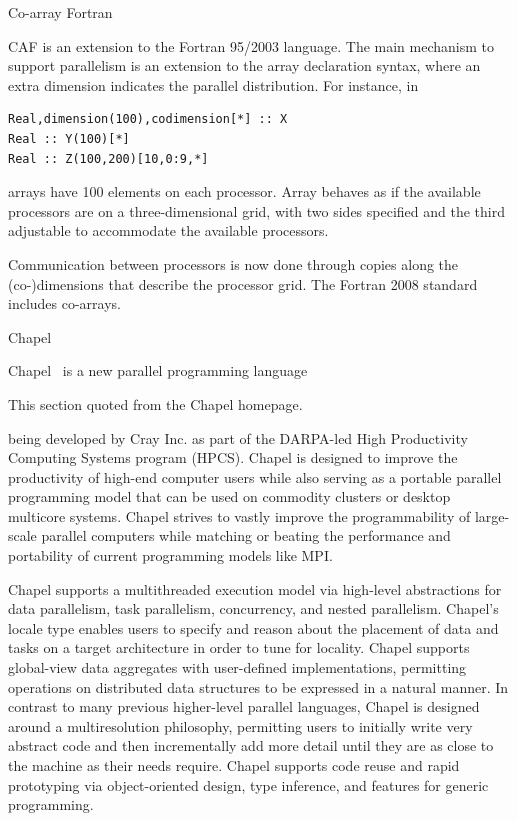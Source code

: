
 {Co-array Fortran}

\acf{CAF} is an extension to the Fortran 95/2003 language.
The main mechanism to support parallelism is an extension to the array
declaration syntax, where an extra dimension indicates the parallel
distribution. For instance, in
\begin{verbatim}
Real,dimension(100),codimension[*] :: X
Real :: Y(100)[*]
Real :: Z(100,200)[10,0:9,*]
\end{verbatim}
arrays  have 100 elements on each processor.
Array  behaves as if the available processors
are on a three-dimensional grid, with two sides specified 
and the third adjustable to accommodate the available processors.

Communication between processors is now done through copies along the
(co-)dimensions that describe the processor grid.
The Fortran 2008 standard includes co-arrays.


 {Chapel}
\label{sec:Chapel}

Chapel~\cite{Chapel:homepage} is a new parallel programming
language
\begin{footnoteenv}
  {This section quoted from the Chapel homepage.}
\end{footnoteenv}
being developed by Cray Inc. as part of the DARPA-led High
Productivity Computing Systems program (HPCS). Chapel is designed to
improve the productivity of high-end computer users while also serving
as a portable parallel programming model that can be used on commodity
clusters or desktop multicore systems. Chapel strives to vastly
improve the programmability of large-scale parallel computers while
matching or beating the performance and portability of current
programming models like MPI.

Chapel supports a multithreaded execution model via high-level
abstractions for data parallelism, task parallelism, concurrency, and
nested parallelism. Chapel's locale type enables users to specify and
reason about the placement of data and tasks on a target architecture
in order to tune for locality. Chapel supports global-view data
aggregates with user-defined implementations, permitting operations on
distributed data structures to be expressed in a natural manner. In
contrast to many previous higher-level parallel languages, Chapel is
designed around a multiresolution philosophy, permitting users to
initially write very abstract code and then incrementally add more
detail until they are as close to the machine as their needs
require. Chapel supports code reuse and rapid prototyping via
object-oriented design, type inference, and features for generic
programming.

